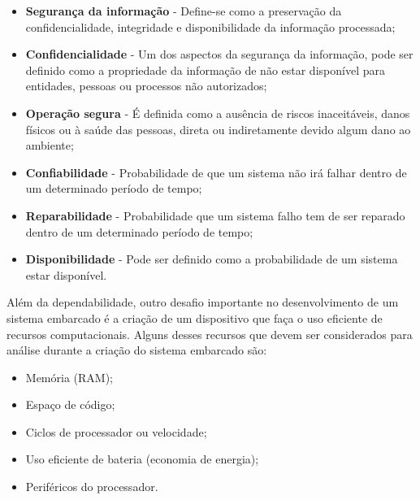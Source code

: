 \begin{itemize}

    \item \textbf{Segurança da informação} - Define-se como a preservação da confidencialidade, integridade e disponibilidade da informação processada;
    
    \item \textbf{Confidencialidade} - Um dos aspectos da segurança da informação, pode ser definido como a propriedade da informação de não estar disponível para entidades, pessoas ou processos não autorizados;
    
    \item \textbf{Operação segura} - É definida como a ausência de riscos inaceitáveis, danos físicos ou à saúde das pessoas, direta ou indiretamente devido algum dano ao ambiente;
    
    \item \textbf{Confiabilidade} - Probabilidade de que um sistema não irá falhar dentro de um determinado período de tempo;
    
    \item \textbf{Reparabilidade} - Probabilidade que um sistema falho tem de ser reparado dentro de um determinado período de tempo;
    
    \item \textbf{Disponibilidade} - Pode ser definido como a probabilidade de um sistema estar disponível.
    
    
\end{itemize}

\newpage

Além da dependabilidade, outro desafio importante no desenvolvimento de um sistema embarcado é a criação de um dispositivo que faça o uso eficiente de recursos computacionais. Alguns desses recursos que devem ser considerados para análise durante a criação do sistema embarcado são:

\begin{itemize}

    \item Memória (\gls{RAM});
    \item Espaço de código;
    \item Ciclos de processador ou velocidade;
    \item Uso eficiente de bateria (economia de energia);
    \item Periféricos do processador.
    
\end{itemize}   


